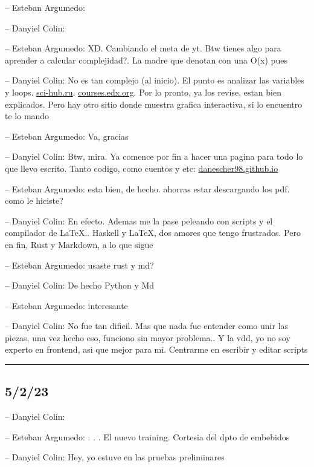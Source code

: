-- Esteban Argumedo:

-- Danyiel Colin:

-- Esteban Argumedo: XD. Cambiando el meta de yt. Btw tienes algo para
aprender a calcular complejidad?. La madre que denotan con una O(x) pues

-- Danyiel Colin: No es tan complejo (al inicio). El punto es analizar
las variables y loops.
\href{https://sci-hub.ru/downloads/2019-04-10/cb/bae2019.pdf}{sci-hub.ru}.
\href{https://courses.edx.org/c4x/MITx/6.00.1x_5/asset/handouts_Big_O_Notes.pdf}{courses.edx.org}.
Por lo pronto, ya los revise, estan bien explicados. Pero hay otro sitio
donde muestra grafica interactiva, si lo encuentro te lo mando

-- Esteban Argumedo: Va, gracias

-- Danyiel Colin: Btw, mira. Ya comence por fin a hacer una pagina para
todo lo que llevo escrito. Tanto codigo, como cuentos y etc:
\href{https://danescher98.github.io/ShortStories/14_GrutaEnVasija/}{danescher98.github.io}

-- Esteban Argumedo: esta bien, de hecho. ahorras estar descargando los
pdf. como le hiciste?

-- Danyiel Colin: En efecto. Ademas me la pase peleando con scripts y el
compilador de LaTeX.. Haskell y LaTeX, dos amores que tengo frustrados.
Pero en fin, Rust y Markdown, a lo que sigue

-- Esteban Argumedo: usaste rust y md?

-- Danyiel Colin: De hecho Python y Md

-- Esteban Argumedo: interesante

-- Danyiel Colin: No fue tan dificil. Mas que nada fue entender como
unir las piezas, una vez hecho eso, funciono sin mayor problema.. Y la
vdd, yo no soy experto en frontend, asi que mejor para mi. Centrarme en
escribir y editar scripts

\begin{center}\rule{0.5\linewidth}{0.5pt}\end{center}

\hypertarget{section-198}{%
\subsection{5/2/23}\label{section-198}}

-- Danyiel Colin:

-- Esteban Argumedo: . . . El nuevo training. Cortesia del dpto de
embebidos

-- Danyiel Colin: Hey, yo estuve en las pruebas preliminares

